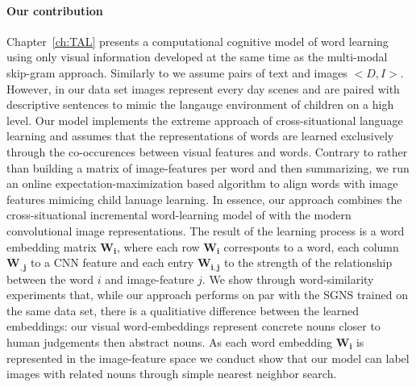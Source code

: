 \paragraph{Our contribution}
Chapter~\ref{ch:TAL} presents a computational cognitive model of word learning using only
visual information developed at the same time as the multi-modal skip-gram approach.
Similarly to \cite{feng2010visual} we assume pairs of text and images
$<D, I>$. However, in our data set images represent every day scenes and are paired with descriptive
sentences to mimic the langauge environment of children on a high level.
Our model implements the extreme approach of cross-situational language
learning and assumes that the representations of words are learned exclusively through the co-occurences
between visual features and words. Contrary to \cite{kiela2014learning} rather than building a
matrix of image-features per word and then summarizing, we run an online expectation-maximization based
algorithm to align words with image features mimicing child lanuage learning.
In essence, our approach combines the cross-situational incremental word-learning model
of \cite{fazly.etal.10csj} with the modern convolutional image representations.
The result of the learning process is a word embedding matrix $\mathbf{W_i}$,
where each row $\mathbf{W_i}$ corresponts to a word, each column $\mathbf{W_{,j}}$
to a CNN feature and each entry $\mathbf{W_{i,j}}$ to the strength
of the relationship between the word $i$ and image-feature $j$.
We show through word-similarity experiments that, while our approach performs on
par with the SGNS trained on the same data set, there is a qualitiative difference between
the learned embeddings: our visual word-embeddings represent concrete nouns closer to human
judgements then abstract nouns. As each word embedding $\mathbf{W_i}$ is represented in the
image-feature space we conduct show that our model can label images with related nouns through
simple nearest neighbor search.

